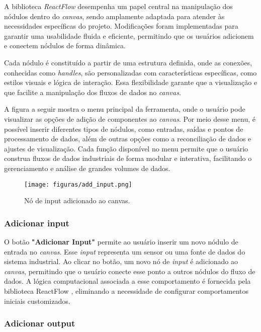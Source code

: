 A biblioteca \textit{ReactFlow} \cite{reactflow} desempenha um papel central na manipulação dos nódulos dentro do \textit{canvas}, sendo amplamente adaptada para atender às necessidades específicas do projeto. Modificações foram implementadas para garantir uma usabilidade fluida e eficiente, permitindo que os usuários adicionem e conectem nódulos de forma dinâmica.

Cada nódulo é constituído a partir de uma estrutura definida, onde as conexões, conhecidas como \textit{handles}, são personalizadas com características específicas, como estilos visuais e lógica de interação. Essa flexibilidade garante que a visualização e que facilite a manipulação dos fluxos de dados no \textit{canvas}.

A figura a seguir mostra o menu principal da ferramenta, onde o usuário pode visualizar as opções de adição de componentes ao \textit{canvas}. Por meio desse menu, é possível inserir diferentes tipos de nódulos, como entradas, saídas e pontos de processamento de dados, além de outras opções como a reconciliação de dados e ajustes de visualização. Cada função disponível no menu permite que o usuário construa fluxos de dados industriais de forma modular e interativa, facilitando o gerenciamento e análise de grandes volumes de dados.

\begin{figure}[htbp]
    \centering
    \texttt{[image: figuras/add\_input.png]}
    \caption{Nó de input adicionado ao canvas.}
    \label{Fig:AddInput}
\end{figure}



\subsubsection{Adicionar input}

O botão \textbf{"Adicionar Input"} permite ao usuário inserir um novo nódulo de entrada no \textit{canvas}. Esse \textit{input} representa um sensor ou uma fonte de dados do sistema industrial. Ao clicar no botão, um novo nó de \textit{input} é adicionado ao \textit{canvas}, permitindo que o usuário conecte esse ponto a outros nódulos do fluxo de dados. A lógica computacional associada a esse comportamento é fornecida pela biblioteca ReactFlow \cite{reactflow}, eliminando a necessidade de configurar comportamentos iniciais customizados.

\subsubsection{Adicionar output}

